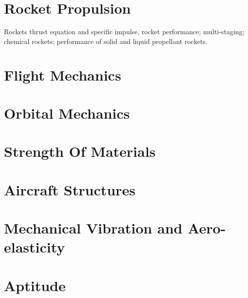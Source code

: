 \section{Rocket Propulsion}
Rockets thrust equation and specific impulse, rocket performance; multi-staging; chemical rockets; performance of solid and liquid propellant rockets.

\section{Flight Mechanics}

\section{Orbital Mechanics}

\section{Strength Of Materials}

\section{Aircraft Structures}

\section{Mechanical Vibration and Aero-elasticity}

\section{Aptitude}